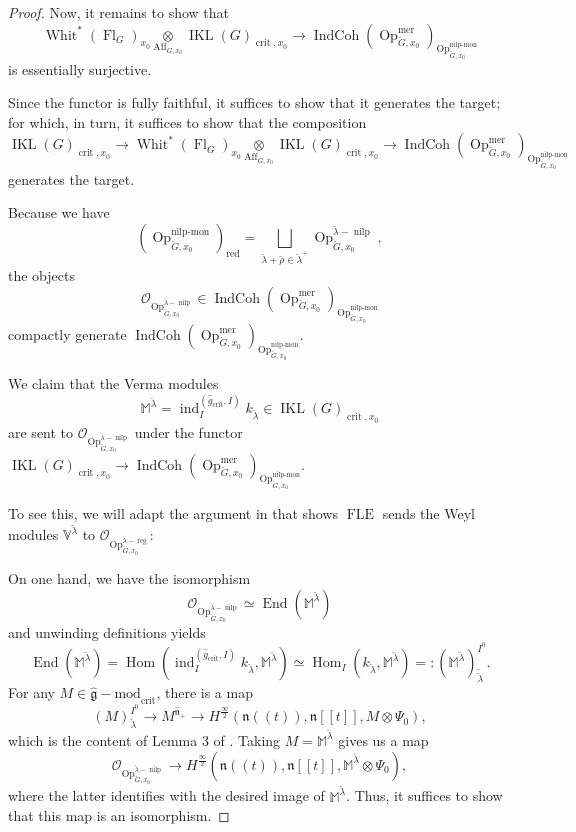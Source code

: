\documentclass[10pt]{amsart}
\theoremstyle{remark}
\newcommand{\on}[1]{\operatorname{#1}}
\newcommand{\IndCoh}{\on{IndCoh}}
\newcommand{\gmod}{\on{\hat{\mathfrak{g}}-mod}}
\newcommand{\IKLx}{\on{IKL}(G)_{\on{crit}, x_0}}
\newcommand{\Gcheck}{\check{G}}
\begin{document}
\begin{proof}
    Now, it remains to show that 
    $$
    \on{Whit}^*(\on{Fl}_G)_{x_0} \underset{\on{Aff}_{G, x_0}}{\otimes} \IKLx \to \IndCoh(\on{Op}_{\Gcheck, x_0}^{\on{mer}})_{\on{Op}_{\Gcheck, x_0}^{\on{nilp-mon}}}
    $$
    is essentially surjective.
    
    Since the functor is fully faithful, it suffices to show that it generates the target; for which, in turn, it suffices to show that the composition
    $$
    \IKLx \to \on{Whit}^*(\on{Fl}_G)_{x_0} \underset{\on{Aff}_{G, x_0}}{\otimes} \IKLx \to \IndCoh(\on{Op}_{\Gcheck, x_0}^{\on{mer}})_{\on{Op}_{\Gcheck, x_0}^{\on{nilp-mon}}}
    $$
    generates the target.

    Because we have
    $$
    (\on{Op}_{\Gcheck, x_0}^{\on{nilp-mon}})_{\on{red}} = \bigsqcup_{\check{\lambda} + \check{\rho} \in \check{\lambda}^+} \on{Op}_{\Gcheck, x_0}^{\check{\lambda}-\on{nilp}},
    $$
    the objects 
    $$
    \mathcal{O}_{\on{Op}_{\Gcheck, x_0}^{\check{\lambda}-\on{nilp}}} \in \IndCoh(\on{Op}_{\Gcheck, x_0}^{\on{mer}})_{\on{Op}_{\Gcheck, x_0}^{\on{nilp-mon}}}
    $$
    compactly generate $\IndCoh(\on{Op}_{\Gcheck, x_0}^{\on{mer}})_{\on{Op}_{\Gcheck, x_0}^{\on{nilp-mon}}}$.

    We claim that the Verma modules
    $$
    \mathbb{M}^{\check{\lambda}} = \on{ind}_{I}^{(\hat{g}_{\on{crit}}, I)} k_{\check{\lambda}} \in \IKLx
    $$
    are sent to $\mathcal{O}_{\on{Op}_{\Gcheck, x_0}^{\check{\lambda}-\on{nilp}}}$ under the functor $\IKLx \to \IndCoh(\on{Op}_{\Gcheck, x_0}^{\on{mer}})_{\on{Op}_{\Gcheck, x_0}^{\on{nilp-mon}}}$.

    To see this, we will adapt the argument in \cite{FG} that shows $\on{FLE}$ sends the Weyl modules $\mathbb{V}^{\check{\lambda}}$ to $\mathcal{O}_{\on{Op}_{\Gcheck, x_0}^{\check{\lambda}-\on{reg}}}$:

    On one hand, we have the isomorphism
    $$
    \mathcal{O}_{\on{Op}_{\Gcheck, x_0}^{\check{\lambda}-\on{nilp}}} \simeq \on{End}(\mathbb{M}^{\check{\lambda}})
    $$
    and unwinding definitions yields
    $$
    \on{End}(\mathbb{M}^{\check{\lambda}}) = \on{Hom}(\on{ind}_{I}^{(\hat{g}_{\on{crit}}, I)} k_{\check{\lambda}}, \mathbb{M}^{\check{\lambda}}) \simeq \on{Hom}_{I}(k_{\check{\lambda}}, \mathbb{M}^{\check{\lambda}}) =: (\mathbb{M}^{\check{\lambda}})_{\check{\check{\lambda}}}^{I^0}.
    $$
    For any $M \in \gmod_{\on{crit}}$, there is a map
    $$
    (M)_{\check{\lambda}}^{I^0} \to M^{\hat{\mathfrak{n}}_{+}} \to H^{\frac{\infty}{2}}(\mathfrak{n}((t)), \mathfrak{n}[[t]], M \otimes \Psi_0),
    $$
    which is the content of Lemma 3 of \cite{FG}.
    Taking $M = \mathbb{M}^{\check{\lambda}}$ gives us a map
    $$
    \mathcal{O}_{\on{Op}_{\Gcheck, x_0}^{\check{\lambda}-\on{nilp}}} \to H^{\frac{\infty}{2}}(\mathfrak{n}((t)), \mathfrak{n}[[t]], \mathbb{M}^{\check{\lambda}} \otimes \Psi_0),
    $$
    where the latter identifies with the desired image of $\mathbb{M}^{\check{\lambda}}$. Thus, it suffices to show that this map is an isomorphism.


\end{proof}
\end{document}
